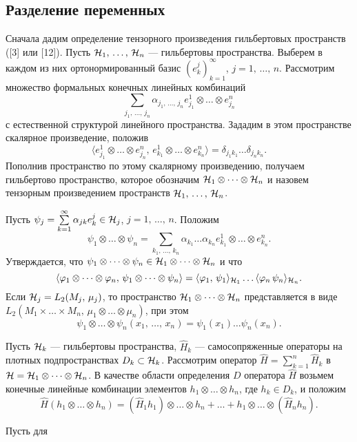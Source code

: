 \documentclass[a4paper
]{article}
\begin{document}
\subsection{Разделение переменных}
Сначала дадим определение тензорного произведения гильбертовых
пространств ([3] или [12]). Пусть ${\cal H}_1, \, \dots, \,
{\cal H}_n$ --- гильбертовы пространства. Выберем в каждом из них
ортонормированный базис $(e_k^j)_{k=1}^\infty$, $j=1, \, \dots, \, n$.
Рассмотрим множество формальных конечных линейных комбинаций $$\sum \limits
_{j_1, \, \dots, \, j_n}\alpha_{j_1, \, \dots, \, j_n}e^1_{j_1}
\otimes\dots\otimes e^n_{j_n}$$ с естественной структурой линейного
пространства. Зададим в этом пространстве скалярное произведение,
положив $$\langle e_{j_1}^1\otimes \dots\otimes e_{j_n}^n, \,
e_{k_1}^1\otimes \dots\otimes e_{k_n}^n\rangle=\delta_{j_1k_1}\dots
\delta_{j_nk_n}.$$ Пополнив пространство по этому скалярному произведению,
получаем гильбертово пространство, которое обозначим ${\cal H}_1
\otimes \dots\otimes {\cal H}_n$ и назовем тензорным произведением
пространств ${\cal H}_1, \, \dots, \, {\cal H}_n$. \par
Пусть $\psi_j=\sum \limits_{k=1}^\infty \alpha_{jk}e_k^j\in {\cal H}_j$,
$j=1, \, \dots, \, n$. Положим $$\psi_1\otimes \dots\otimes\psi_n
=\sum \limits_{k_1, \, \dots, \, k_n}\alpha_{k_1}\dots\alpha_{k_n}
e_{k_1}^1\otimes \dots\otimes e_{k_n}^n.$$ Утверждается, что
$\psi_1\otimes \dots\otimes\psi_n\in {\cal H}_1\otimes \dots\otimes
{\cal H}_n$ и что $$\langle \varphi_1\otimes \dots\otimes \varphi_n, \,
\psi_1\otimes\dots\otimes\psi_n\rangle =\langle \varphi _1, \, \psi _1\rangle
_{{\cal H}_1}\dots \langle \varphi _n \, \psi_n\rangle_{{\cal H}_n}.$$
Если ${\cal H}_j=L_2(M_j, \, \mu_j)$, то пространство ${\cal H}_1\otimes
\dots\otimes {\cal H}_n$ представляется в виде $L_2(M_1\times\dots\times M_n,
\, \mu_1\otimes \dots\otimes \mu_n)$, при этом
$$\psi_1\otimes\dots\otimes \psi_n(x_1, \, \dots,\, x_n)=\psi_1(x_1)
\dots\psi_n(x_n).$$ \par
Пусть ${\cal H}_k$ --- гильбертовы пространства, $\hat H_k$ ---
самосопряженные операторы на плотных подпространствах $D_k\subset
{\cal H}_k$. Рассмотрим оператор $\hat H=\sum \limits_{k=1}^n\hat H_k$
в ${\cal H}={\cal H}_1\otimes\dots \otimes {\cal H}_n$. В качестве
области определения $D$ оператора $\hat H$ возьмем конечные линейные
комбинации элементов $h_1\otimes \dots \otimes h_n$, где $h_k\in D_k$, и положим
$$\hat H(h_1\otimes \dots \otimes h_n)=(\hat H_1h_1)\otimes\dots\otimes
h_n+\dots+h_1\otimes\dots \otimes(\hat H_nh_n).$$ \par Пусть для
\end{document}
